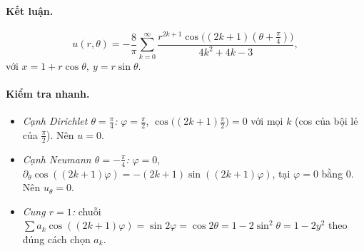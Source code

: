\paragraph{Kết luận.}\leavevmode

\begin{nhobox}
\[
  u(r,\theta)=-\frac{8}{\pi}\sum_{k=0}^{\infty}\frac{r^{2k+1}\cos\!\big((2k+1)(\theta+\tfrac{\pi}{4})\big)}{4k^2+4k-3},
\]
với $x=1+r\cos\theta,\ y=r\sin\theta$.
\end{nhobox}

\paragraph{Kiểm tra nhanh.}
\begin{itemize}
  \item \emph{Cạnh Dirichlet $\theta=\tfrac{\pi}{4}$:} $\varphi=\tfrac{\pi}{2}$, $\cos\!\big((2k+1)\tfrac{\pi}{2}\big)=0$ với mọi $k$ (cos của bội lẻ của $\tfrac{\pi}{2}$). Nên $u=0$. \checkmark
  \item \emph{Cạnh Neumann $\theta=-\tfrac{\pi}{4}$:} $\varphi=0$, $\partial_\theta\cos((2k+1)\varphi)=-(2k+1)\sin((2k+1)\varphi)$, tại $\varphi=0$ bằng $0$. Nên $u_\theta=0$. \checkmark
  \item \emph{Cung $r=1$:} chuỗi $\sum a_k\cos((2k+1)\varphi)=\sin 2\varphi=\cos 2\theta=1-2\sin^2\theta=1-2y^2$ theo đúng cách chọn $a_k$. \checkmark
\end{itemize}
